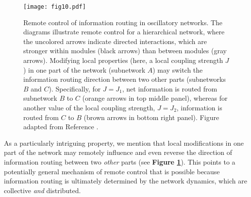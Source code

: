 \documentclass[
preprint,
superscriptaddress,
aps,
prl,
]{revtex4-1}
\begin{document}
 \begin{figure}[t] 
\texttt{[image: fig10.pdf]}
\caption{
Remote control of information routing in oscillatory networks.
The diagrams illustrate remote control for a hierarchical network, where the uncolored arrows indicate directed 
interactions, which are stronger within modules (black arrows)  than between modules (gray arrows).
Modifying local properties 
(here, a local coupling strength $J$) in one part of the network  (subnetwork $A$) may switch the information routing direction 
between two other parts (subnetworks $B$ and $C$). Specifically, for $J=J_1$, net information is routed from subnetwork $B$ to $C$ 
(orange arrows in top middle panel), whereas for another value of the local coupling strength, $J=J_2$, information is routed from $C$ to $B$ 
(brown arrows in bottom right panel). Figure adapted from Reference \cite{Kirst2016}.
}
\label{fig10}
\end{figure}

As a particularly intriguing property,  we mention that
local modifications in one part of the network
may  remotely influence and
 even reverse the direction of
 information  
 routing
 between two {\it other} parts  (see \textbf{Figure \ref{fig10}}).
 This points to a potentially general mechanism of remote control that
 is possible because information routing is ultimately determined by the network dynamics, which
   {\color{black} are}
 collective {\it and} distributed.
 
\end{document}

